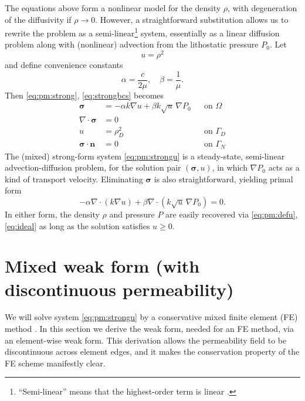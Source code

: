 \documentclass[11pt]{amsart}
\newcommand{\bn}{\mathbf{n}}
\newcommand{\bsigma}{\bm{\sigma}}
\newcommand{\Div}{\nabla\cdot}
\newcommand{\grad}{\nabla}
\begin{document}
The equations above form a nonlinear model for the density $\rho$, with degeneration of the diffusivity if $\rho \to 0$.  However, a straightforward substitution allows us to rewrite the problem as a semi-linear\footnote{``Semi-linear'' means that the highest-order term is linear \citep[section 1.1]{Evans2010}.} system, essentially as a linear diffusion problem along with (nonlinear) advection from the lithostatic pressure $P_0$.  Let
\begin{equation}
u = \rho^2 \label{eq:pm:defu}
\end{equation}
and define convenience constants
\begin{equation}
\alpha = \frac{c}{2\mu}, \quad \beta = \frac{1}{\mu}. \label{eq:pm:convenience}
\end{equation}
Then \eqref{eq:pm:strong}, \eqref{eq:strongbcs} becomes
\begin{subequations}
\label{eq:pm:strongu}
\begin{align}
\bsigma &= - \alpha k \grad u + \beta k \sqrt{u}\, \grad P_0 & &\text{on } \Omega \label{eq:pm:strongu:darcy} \\
\Div \bsigma &= 0 & & \label{eq:pm:strongu:masscont} \\
u &= \rho_D^2 & &\text{on } \Gamma_D  \label{eq:pm:strongu:bcD} \\
\bsigma\cdot \bn &= 0 & &\text{on } \Gamma_N  \label{eq:pm:strongu:bcN} 
\end{align}
\end{subequations}
The (mixed) strong-form system \eqref{eq:pm:strongu} is a steady-state, semi-linear advection-diffusion problem, for the solution pair $(\bsigma,u)$, in which $\grad P_0$ acts as a kind of transport velocity.  Eliminating $\bsigma$ is also straightforward, yielding primal form
\begin{equation}
-\alpha \Div(k\grad u) + \beta \Div(k \sqrt{u}\, \grad P_0) = 0. \label{eq:pm:primalstrongu}
\end{equation}
In either form, the density $\rho$ and pressure $P$ are easily recovered via \eqref{eq:pm:defu}, \eqref{eq:ideal} as long as the solution satisfies $u\ge 0$.

\section{Mixed weak form (with discontinuous permeability)}

We will solve system \eqref{eq:pm:strongu} by a conservative mixed finite element (FE) method \citep{Boffi2013}.  In this section we derive the weak form, needed for an FE method, via an element-wise weak form.  This derivation allows the permeability field to be discontinuous across element edges, and it makes the conservation property of the FE scheme manifestly clear.
\end{document}
